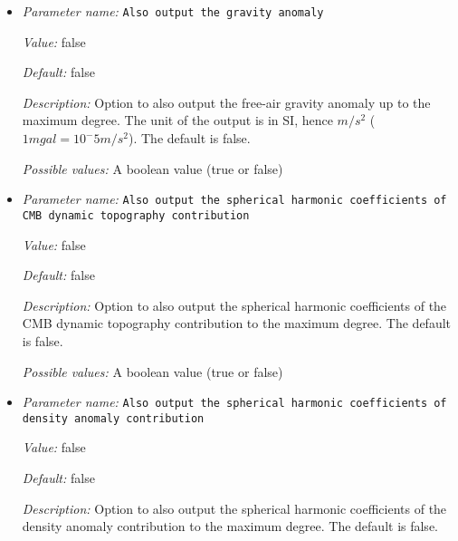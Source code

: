 \begin{itemize}
\item {\it Parameter name:} {\tt Also output the gravity anomaly}
\label{parameters:Postprocess/Geoid/Also output the gravity anomaly}


{\it Value:} false


{\it Default:} false


{\it Description:} Option to also output the free-air gravity anomaly up to the maximum degree. The unit of the output is in SI, hence $m/s^2$ ($1mgal = 10^-5 m/s^2$). The default is false. 


{\it Possible values:} A boolean value (true or false)
\item {\it Parameter name:} {\tt Also output the spherical harmonic coefficients of CMB dynamic topography contribution}
\label{parameters:Postprocess/Geoid/Also output the spherical harmonic coefficients of CMB dynamic topography contribution}


{\it Value:} false


{\it Default:} false


{\it Description:} Option to also output the spherical harmonic coefficients of the CMB dynamic topography contribution to the maximum degree. The default is false. 


{\it Possible values:} A boolean value (true or false)
\item {\it Parameter name:} {\tt Also output the spherical harmonic coefficients of density anomaly contribution}
\label{parameters:Postprocess/Geoid/Also output the spherical harmonic coefficients of density anomaly contribution}


{\it Value:} false


{\it Default:} false


{\it Description:} Option to also output the spherical harmonic coefficients of the density anomaly contribution to the maximum degree. The default is false. 



\end{itemize}
